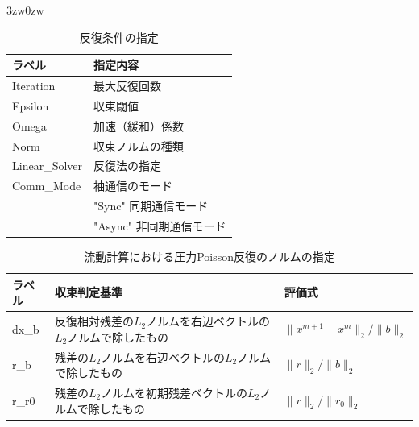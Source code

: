 \begin{indentation}{3zw}{0zw}

\begin{table}[htdp]
\caption{反復条件の指定}
\begin{center}
\small
\begin{tabular}{ll} \toprule
ラベル & 指定内容\\ \midrule
Iteration & 最大反復回数\\
Epsilon & 収束閾値\\
Omega & 加速（緩和）係数\\
Norm & 収束ノルムの種類\\ 
Linear\_Solver & 反復法の指定\\ \hline
Comm\_Mode & 袖通信のモード\\
 & "Sync" 同期通信モード\\
 & "Async" 非同期通信モード\\ \bottomrule
\end{tabular}
\end{center}
\label{tbl:flow_itr}
\end{table}


\begin{table}[htdp]
\caption{流動計算における圧力Poisson反復のノルムの指定}
\begin{center}
\small
\begin{tabular}{lll} \toprule
ラベル & 収束判定基準 & 評価式\\ \midrule
dx\_b & 反復相対残差の$L_2$ノルムを右辺ベクトルの$L_2$ノルムで除したもの & $\|x^{m+1}-x^m \|_2 \bigg / \|b\|_2$\\
\vspace{2mm}
r\_b & 残差の$L_2$ノルムを右辺ベクトルの$L_2$ノルムで除したもの & $\| r \|_2 \bigg / \|b\|_2$\\
\vspace{2mm}
r\_r0 & 残差の$L_2$ノルムを初期残差ベクトルの$L_2$ノルムで除したもの & $\|r\|_2 \bigg / \|r_0\|_2$\\ 
\bottomrule
\end{tabular}
\end{center}
\label{tbl:norm-type Poisson}
\end{table}



\end{indentation}
